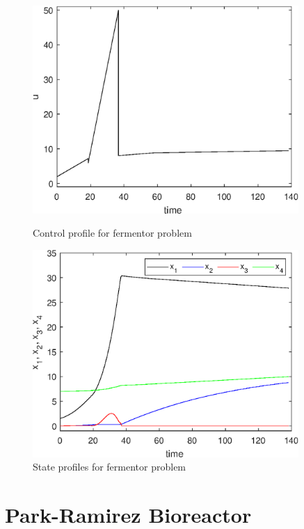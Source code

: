 \begin{figure} 
	\begin{minipage}[t]{0.5\linewidth}
		\includegraphics[width=0.9\textwidth]{examples/problem-fermentor/graphs/fermentor_control.eps}
		\caption[Problem 6: Control profile]{Control profile for fermentor problem}
		\label{fig:prob_fermentor_u} 
	\end{minipage}
	\begin{minipage}[t]{0.5\linewidth}
		\centering
		\includegraphics[width=0.9\textwidth]{examples/problem-fermentor/graphs/fermentor_states.eps}
		\caption[Problem 6: State profiles]{State profiles for fermentor problem}
		\label{fig:prob_fermentor_x}  
	\end{minipage}
\end{figure}

\section{Park-Ramirez Bioreactor}
\label{sec:prob_pr_bior}

